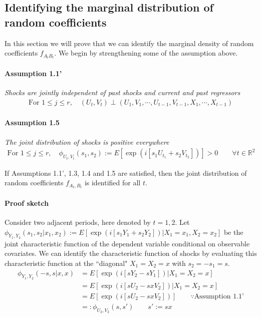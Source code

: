 \subsection{Identifying the marginal distribution of random coefficients}

In this section we will prove that we can identify the marginal density of random coefficients $f_{A_tB_t}$. We begin by strengthening some of the assumption above.

\paragraph{Assumption 1.1'} \label{a:sequentialindependence}
\textit{Shocks are jointly independent of past shocks and current and past regressors}
\begin{align}
  \text{For }1 \leq j \leq r,
  \quad     
  (U_{t}, V_{t}) \perp (U_{1}, V_{1}, \cdots, U_{t-1}, V_{t-1}, X_{1}, \cdots, X_{t-1})
\end{align}

\paragraph{Assumption 1.5} \label{a:}
\textit{The joint distribution of shocks is positive everywhere}
\begin{align}
  \text{For }1 \leq j \leq r,
  \quad     
  \phi_{U_t, V_t}(s_1, s_2) := E[\exp(i[s_1 U_{t_1} + s_{2} V_{t_2}])] > 0 \qquad \forall t \in \mathbb{R}^2
\end{align}  

\begin{theorem} If Assumptions 1.1', 1.3, 1.4 and 1.5 are satisfied, then the joint distribution of random coefficients $f_{A_t, B_t}$ is identified for all $t$.
\end{theorem}

\paragraph{Proof sketch} Consider two adjacent periods, here denoted by $t = 1,2$. Let $\phi_{Y_{1}, Y_{2}}(s_1, s_2| x_{1},x_{2}) := E[\exp(i[s_1 Y_{1} + s_{2} Y_{2}])| X_{1} = x_{1}, X_{2} = x_{2}]$ be the joint characteristic function of the dependent variable conditional on observable covariates. We can identify the characteristic function of shocks by evaluating this characteristic function at the ``diagonal" $X_1 = X_2 = x$ with $s_{2} = -s_{1} = s$.
\begin{align}
\phi_{Y_{1}, Y_{2}}(-s, s| x, x) &= E[\exp(i[sY_{2} - sY_{1}])| X_{1} = X_{2} = x] \\
                          &= E[\exp(i[sU_{2} - sxV_{2}])| X_{1} = X_{2} = x] \\ 
                          &= E[\exp(i[sU_{2} - sxV_{2}])] \qquad \because \text{Assumption 1.1'}    \\
                          &=: \phi_{U_{2},V_{2}}(s, s') \qquad s' := sx          
\end{align}

